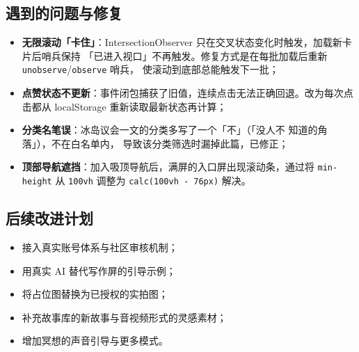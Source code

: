 \documentclass[12pt,a4paper]{ctexart}
\begin{document}
\subsection{遇到的问题与修复}

\begin{itemize}
  \item \textbf{无限滚动「卡住」}：IntersectionObserver 只在交叉状态变化时触发，加载新卡片后哨兵保持
    「已进入视口」不再触发。修复方式是在每批加载后重新 \texttt{unobserve}/\texttt{observe} 哨兵，
    使滚动到底部总能触发下一批；
  \item \textbf{点赞状态不更新}：事件闭包捕获了旧值，连续点击无法正确回退。改为每次点击都从 localStorage
    重新读取最新状态再计算；
  \item \textbf{分类名笔误}：冰岛议会一文的分类多写了一个「不」（「没人不 知道的角落」），不在白名单内，
    导致该分类筛选时漏掉此篇，已修正；
  \item \textbf{顶部导航遮挡}：加入吸顶导航后，满屏的入口屏出现滚动条，通过将 \texttt{min-height} 从
    \texttt{100vh} 调整为 \texttt{calc(100vh - 76px)} 解决。
\end{itemize}

\subsection{后续改进计划}

\begin{itemize}
  \item 接入真实账号体系与社区审核机制；
  \item 用真实 AI 替代写作屏的引导示例；
  \item 将占位图替换为已授权的实拍图；
  \item 补充故事库的新故事与音视频形式的灵感素材；
  \item 增加冥想的声音引导与更多模式。
\end{itemize}
\end{document}
